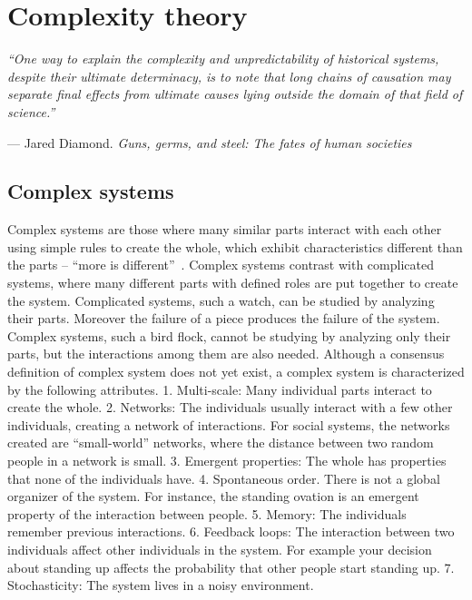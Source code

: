 \section{Complexity theory}
\label{sec:complexity}
\textit{``One way to explain the complexity and unpredictability of historical systems, despite their ultimate determinacy, is to note that long chains of causation may separate final effects from ultimate causes lying outside the domain of that field of science.''}
\begin{flushright}
--- Jared Diamond. \textit{Guns, germs, and steel: The fates of human societies}
\end{flushright}


\subsection{Complex systems}
\label{sec:characteristics}
Complex systems are those where many similar parts interact with each other using simple rules to create the whole,
which exhibit characteristics different than the parts --
``more is different''~\citep{anderson1972}.
Complex systems contrast with complicated systems, where many different parts with defined roles are put together to create the system. 
Complicated systems, such a watch, can be studied by analyzing their parts. 
Moreover the failure of a piece produces the failure of the system.
Complex systems, such a bird flock, cannot be studying by analyzing only their parts, 
but the interactions among them are also needed.  
Although a consensus definition of complex system does not yet exist, a complex system is characterized by the following attributes. 
1. Multi-scale: Many individual parts interact to create the whole. 
2. Networks: The individuals usually interact with a few other individuals, creating a network of interactions. For social systems, the networks created are ``small-world'' networks, where the distance between two random people in a network is small.  
3. Emergent properties: The whole has properties that none of the individuals have. 
4. Spontaneous order. There is not a global organizer of the system. For instance, the standing ovation is an emergent property of the interaction between people. 
5. Memory: The individuals remember previous interactions. 
6. Feedback loops: The interaction between two individuals affect other individuals in the system. For example your decision about standing up affects the probability that other people start standing up.  
7. Stochasticity: The system lives in a noisy environment. 
